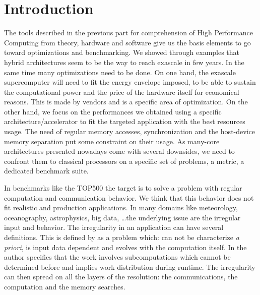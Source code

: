 
\chapter*{Introduction}

The tools described in the previous part for comprehension of High Performance Computing from theory, hardware and software give us the basis elements to go toward optimizations and benchmarking. 
We showed through examples that hybrid architectures seem to be the way to reach exascale in few years.
In the same time many optimizations need to be done.
On one hand, the exascale supercomputer will need to fit the energy envelope imposed, to be able to sustain the computational power and the price of the hardware itself for economical reasons.  
This is made by vendors and is a specific area of optimization.
On the other hand, we focus on the performances we obtained using a specific architecture/accelerator to fit the targeted application with the best resources usage. 
The need of regular memory accesses, synchronization and the host-device memory separation put some constraint on their usage.
As many-core architectures presented nowadays come with several downsides, we need to confront them to classical processors on a specific set of problems, a metric, a dedicated benchmark suite.

In benchmarks like the TOP500 the target is to solve a problem with regular computation and communication behavior. 
We think that this behavior does not fit realistic and production applications.
In many domains like meteorology, oceanography, astrophysics, big data, \dots the underlying issue are the irregular input and behavior.
The irregularity in an application can have several definitions. 
This is defined by \cite{javairregular} as a problem which: can not be characterize \textit{a priori}, is input data dependent and evolves with the computation itself. 
In \cite{suss2006implementing} the author specifies that the work involves subcomputations which cannot be determined before and implies work distribution during runtime.
The irregularity can then spread on all the layers of the resolution:
the communications, the computation and the memory searches. 

